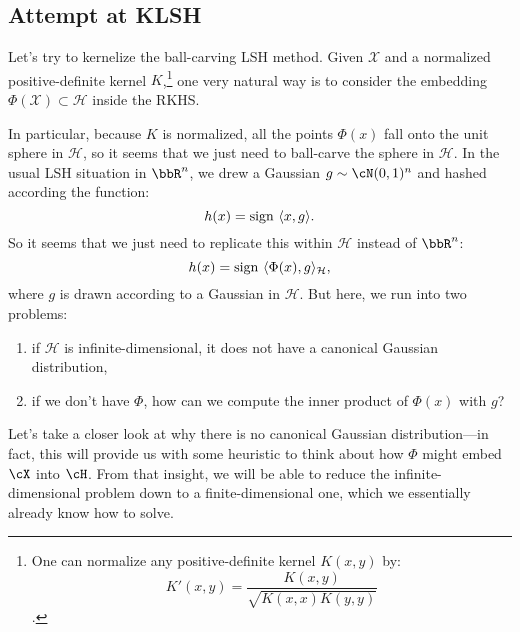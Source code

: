 \documentclass[twoside,11pt]{homework}
\begin{document}
\begin{multicols}{2}




\subsection{Attempt at KLSH} %
Let's try to kernelize the ball-carving LSH method. Given $\mathcal{X}$ and a
normalized positive-definite kernel $K$,\footnote{One can normalize any positive-definite
  kernel $K(x,y)$ by:
  \[K'(x,y) = \frac{K(x,y)}{\sqrt{K(x,x)K(y,y)}}\].}
one very natural way is to consider the embedding $\Phi(\mathcal{X}) \subset \mathcal{H}$
inside the RKHS.

In particular, because $K$ is normalized, all the points $\Phi(x)$ fall onto the unit sphere
in $\mathcal{H}$, so it seems that we just need to ball-carve the sphere in $\mathcal{H}$.
In the usual LSH situation in $\bbR^n$, we drew a Gaussian $g \sim \cN(0,1)^n$ and hashed
according the function:
\[h(x) = \operatorname{sign}\ \langle x, g\rangle.\]
So it seems that we just need to replicate this within $\mathcal{H}$ instead of $\bbR^n$:
\[h(x) = \operatorname{sign}\ \langle \Phi(x), g\rangle_\mathcal{H},\]
where $g$ is drawn according to a Gaussian in $\mathcal{H}$. But here, we run into two problems:
\begin{enumerate}
\item if $\mathcal{H}$ is infinite-dimensional, it does not have a canonical Gaussian distribution, 
\item if we don't have $\Phi$, how can we compute the inner product of $\Phi(x)$ with $g$?
\end{enumerate}

Let's take a closer look at why there is no canonical Gaussian distribution---in fact, this will provide us with some heuristic to think about how $\Phi$ might embed $\cX$ into $\cH$. From that insight, we will be able to reduce the infinite-dimensional problem down to a finite-dimensional one, which we essentially already know how to solve.


\end{multicols}
\end{document}
